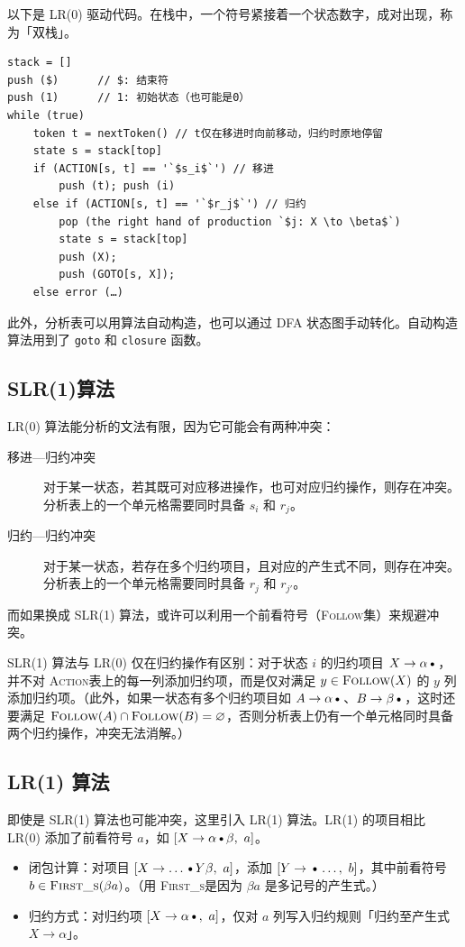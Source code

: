 \documentclass[UTF8]{ctexart}
\newcommand\FOLLOW{\textsc{Follow}}
\newcommand\FIRSTS{\textsc{First\_s}}
\newcommand\ACTION{\textsc{Action}}
\newcommand\D{\text{\textbullet}}
\newcommand\Emph[1]{\textcolor{cyan!80!black}{#1}}
\newcommand\Notes[1]{\textcolor{yellow!50!black}{\small #1}}
\begin{document}
以下是 LR(0) 驱动代码。在栈中，一个符号紧接着一个状态数字，成对出现，称为「双栈」。
\begin{lstlisting}
stack = []
push ($)      // $: 结束符
push (1)      // 1: 初始状态（也可能是0）
while (true)
    token t = nextToken() // t仅在移进时向前移动，归约时原地停留
    state s = stack[top]
    if (ACTION[s, t] == '`$s_i$`') // 移进
        push (t); push (i)
    else if (ACTION[s, t] == '`$r_j$`') // 归约
        pop (the right hand of production `$j: X \to \beta$`)
        state s = stack[top]
        push (X);
        push (GOTO[s, X]);
    else error (…)
\end{lstlisting}

此外，分析表可以用算法自动构造，也可以通过 DFA 状态图手动转化。自动构造算法用到了 \verb!goto! 和 \verb!closure! 函数。

\subsection{SLR(1)算法}

LR(0) 算法能分析的文法有限，因为它可能会有两种冲突：
\begin{description}
    \item[移进—归约冲突] 对于某一状态，若其既可对应移进操作，也可对应归约操作，则存在冲突。分析表上的一个单元格需要同时具备 $s_i$ 和 $r_j$。
    \item[归约—归约冲突] 对于某一状态，若存在多个归约项目，且对应的产生式不同，则存在冲突。分析表上的一个单元格需要同时具备 $r_j$ 和 $r_{j'}$。
\end{description}
而如果换成 \Emph{SLR(1) 算法}，或许可以利用一个前看符号（\FOLLOW 集）来规避冲突。

SLR(1) 算法与 LR(0) 仅在归约操作有区别：对于状态 $i$ 的归约项目 $X\to \alpha\D$，并不对 \ACTION 表上的每一列添加归约项，而是仅对满足 $y\in \FOLLOW(X)$ 的 $y$ 列添加归约项。\Notes{（此外，如果一状态有多个归约项目如 $A\to\alpha\D$、$B\to\beta\D$，这时还要满足 $\FOLLOW(A)\cap\FOLLOW(B)=\varnothing$，否则分析表上仍有一个单元格同时具备两个归约操作，冲突无法消解。）}

\subsection{LR(1) 算法}
即使是 SLR(1) 算法也可能冲突，这里引入 \Emph{LR(1) 算法}。LR(1) 的项目相比 LR(0) 添加了前看符号 $a$，如 $[X\to \alpha\D\beta, \ a]$。

\begin{itemize}
  \item 闭包计算：对项目 $[X\to \dots\D Y \beta,\ a]$，添加 $[Y\to \D\dots,\ b]$，其中前看符号 $b\in \FIRSTS(\beta a)$。\Notes{（用 \FIRSTS 是因为 $\beta a$ 是多记号的产生式。）}
  \item 归约方式：对归约项 $[X\to \alpha\D, \ a]$，仅对 $a$ 列写入归约规则「归约至产生式 $X\to\alpha$」。
\end{itemize}
\end{document}
